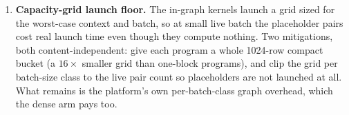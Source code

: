 \documentclass[11pt]{article}
\begin{document}
\begin{enumerate}[itemsep=2pt]
earlier build replayed the recall scan as a \emph{second} CUDA graph per
step; its host-side \texttt{cudaGraphLaunch} waited a full GIL slice and
cost ${\sim}0.9$\,ms/step that did not scale with batch --- enough to sink
bs=1 below $1.0\times$ on its own. The fix is structural, not a knob: bake
the whole recall step into the decode model graph, one launch per step. A
knob-level attempt (shortening the GIL switch interval) helped the target
microcost but regressed the process globally and was reverted; the lesson is
that a per-step fixed cost is worth a structural fix, not a tuning band-aid.
\item \textbf{Capacity-grid launch floor.} The in-graph kernels launch a
grid sized for the worst-case context and batch, so at small live batch the
placeholder pairs cost real launch time even though they compute nothing.
Two mitigations, both content-independent: give each program a whole
1024-row compact bucket (a $16\times$ smaller grid than one-block programs),
and clip the grid per batch-size class to the live pair count so
placeholders are not launched at all. What remains is the platform's own
per-batch-class graph overhead, which the dense arm pays too.
\end{enumerate}
\end{document}

